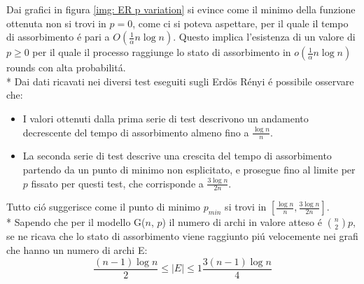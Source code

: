 \documentclass[../Tesi.tex]{subfiles}
\begin{document}
Dai grafici in figura \ref{img: ER p variation} si evince come il minimo della funzione ottenuta non si trovi in $p=0$, come ci si poteva aspettare, per il quale il tempo di assorbimento \'e pari a $O(\frac{1}{\alpha}n\log{}n)$.
Questo implica l'esistenza di un valore di $p \geq 0$ per il quale il processo raggiunge lo stato di assorbimento in $o(\frac{1}{\alpha}n\log{}n)$ rounds con alta probabilit\'a.\\*
Dai dati ricavati nei diversi test eseguiti sugli Erd{\"o}s R\'enyi \'e possibile osservare che:
\begin{itemize}
    \item I valori ottenuti dalla prima serie di test descrivono un andamento decrescente del tempo di assorbimento almeno fino a $\frac{\log{n}}{n}$.
    \item La seconda serie di test descrive una crescita del tempo di assorbimento partendo da un punto di minimo non esplicitato, e prosegue fino al limite per $p$ fissato per questi test, che corrisponde a $\frac{3\log{n}}{2n}$.
\end{itemize}
Tutto ci\'o suggerisce come il punto di minimo $p_{min}$ si trovi in $[\frac{\log{n}}{n} , \frac{3\log{n}}{2n}]$.\\*
Sapendo che per il modello G($n$, $p$) il numero di archi in valore atteso \'e $\binom{n}{2}p$, se ne ricava che lo stato di assorbimento viene raggiunto pi\'u velocemente nei grafi che hanno un numero di archi E:
\begin{equation}
    \frac{(n-1)\log{n}}{2} \leq |E| \le1  \frac{3(n-1)\log{n}}{4}
\end{equation}
\end{document}
